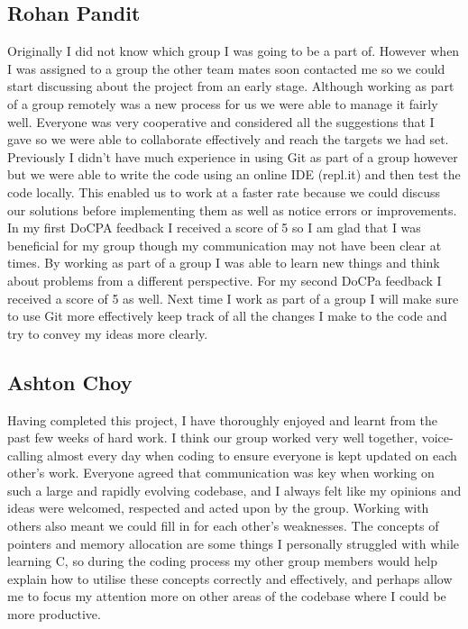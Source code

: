 \documentclass[11pt]{article}
\begin{document}
\subsection*{Rohan Pandit}
Originally I did not know which group I was going to be a part of. However when I was assigned to a group the other team mates soon contacted me so we could start discussing about the project from an early stage. Although working as part of a group remotely was a new process for us we were able to manage it fairly well. Everyone was very cooperative and considered all the suggestions that I gave so we were able to collaborate effectively and reach the targets we had set. Previously I didn't have much experience in using Git as part of a group however but we were able to write the code using an online IDE (repl.it) and then test the code locally. This enabled us to work at a faster rate because we could discuss our solutions before implementing them as well as notice errors or improvements.
In my first DoCPA feedback I received a score of 5 so I am glad that I was beneficial for my group though my communication may not have been clear at times. By working as part of a group I was able to learn new things and think about problems from a different perspective. For my second DoCPa feedback I received a score of 5 as well.
Next time I work as part of a group I will make sure to use Git more effectively keep track of all the changes I make to the code and try to convey my ideas more clearly.  


\subsection*{Ashton Choy}
Having completed this project, I have thoroughly enjoyed and learnt from the past few weeks of hard work. I think our group worked very well together, voice-calling almost every day when coding to ensure everyone is kept updated on each other's work. Everyone agreed that communication was key when working on such a large and rapidly evolving codebase, and I always felt like my opinions and ideas were welcomed, respected and acted upon by the group. Working with others also meant we could fill in for each other's weaknesses. The concepts of pointers and memory allocation are some things I personally struggled with while learning C, so during the coding process my other group members would help explain how to utilise these concepts correctly and effectively, and perhaps allow me to focus my attention more on other areas of the codebase where I could be more productive. 
\end{document}
